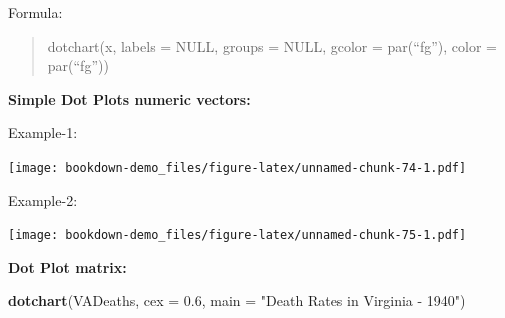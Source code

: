 \documentclass[]{book}
\newenvironment{Shaded}{\begin{snugshade}}{\end{snugshade}}
\newcommand{\KeywordTok}[1]{\textcolor[rgb]{0.13,0.29,0.53}{\textbf{#1}}}
\newcommand{\DataTypeTok}[1]{\textcolor[rgb]{0.13,0.29,0.53}{#1}}
\newcommand{\DecValTok}[1]{\textcolor[rgb]{0.00,0.00,0.81}{#1}}
\newcommand{\FloatTok}[1]{\textcolor[rgb]{0.00,0.00,0.81}{#1}}
\newcommand{\StringTok}[1]{\textcolor[rgb]{0.31,0.60,0.02}{#1}}
\newcommand{\CommentTok}[1]{\textcolor[rgb]{0.56,0.35,0.01}{\textit{#1}}}
\newcommand{\OperatorTok}[1]{\textcolor[rgb]{0.81,0.36,0.00}{\textbf{#1}}}
\newcommand{\NormalTok}[1]{#1}
\begin{document}
Formula:

\begin{quote}
dotchart(x, labels = NULL, groups = NULL, gcolor = par(``fg''), color =
par(``fg''))
\end{quote}

\textbf{Simple Dot Plots numeric vectors: }

Example-1:

\begin{Shaded}
\end{Shaded}

\texttt{[image: bookdown-demo\_files/figure-latex/unnamed-chunk-74-1.pdf]}

Example-2:

\begin{Shaded}
\end{Shaded}

\texttt{[image: bookdown-demo\_files/figure-latex/unnamed-chunk-75-1.pdf]}

\textbf{Dot Plot matrix: }

\begin{Shaded}
\begin{Highlighting}[]
\KeywordTok{dotchart}\NormalTok{(VADeaths, }\DataTypeTok{cex =} \FloatTok{0.6}\NormalTok{,}
         \DataTypeTok{main =} \StringTok{"Death Rates in Virginia - 1940"}\NormalTok{)}
\end{Highlighting}
\end{Shaded}
\end{document}
